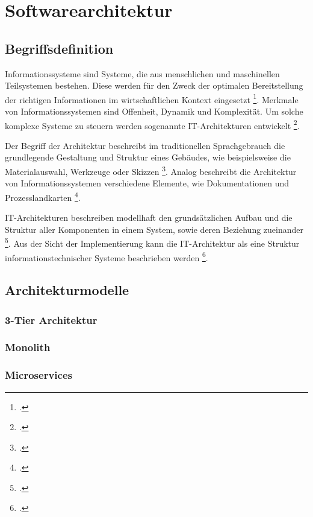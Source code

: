 \newpage
\section{Softwarearchitektur}\label{lab:softwarearchitektur}
\subsection{Begriffsdefinition}

Informationssysteme sind Systeme, die aus menschlichen und maschinellen Teilsystemen bestehen. Diese werden für den Zweck der optimalen Bereitstellung der richtigen Informationen im wirtschaftlichen Kontext eingesetzt \footcite[Vgl.][S.8]{becker2011}. Merkmale von Informationssystemen sind Offenheit, Dynamik und Komplexität. Um solche komplexe Systeme zu steuern werden sogenannte IT-Architekturen entwickelt \footcite[Vgl.][S.11]{becker2011}.

Der Begriff der Architektur beschreibt im traditionellen Sprachgebrauch die grundlegende Gestaltung und Struktur eines Gebäudes, wie beispielsweise die Materialauswahl, Werkzeuge oder Skizzen \footcite[Vgl.][S.16]{schuetz2017}. Analog beschreibt die Architektur von Informationssystemen verschiedene Elemente, wie Dokumentationen und Prozesslandkarten \footcite[Vgl.][S.17]{schuetz2017}.

IT-Architekturen beschreiben modellhaft den grundsätzlichen Aufbau und die Struktur aller Komponenten in einem System, sowie deren Beziehung zueinander \footcite[Vgl.][S.889]{knoll2018}. Aus der Sicht der Implementierung kann die IT-Architektur als eine Struktur informationstechnischer Systeme beschrieben werden \footcite[Vgl.][S.890]{knoll2018}.



\subsection{Architekturmodelle}
\subsubsection{3-Tier Architektur}
\subsubsection{Monolith}
\subsubsection{Microservices}


